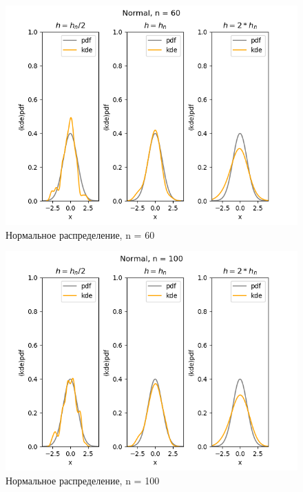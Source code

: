 \documentclass[../body.tex]{subfiles}
\begin{document}
\begin{figure}[H]
	\centering
	\includegraphics[width=\textwidth, height =0.4\textheight]{img/NormalKDE n = 60.png}
	\caption{Нормальное распределение, n = 60}
	\label{fig:normal_kde_60}
\end{figure}

\begin{figure}[H]
	\centering
	\includegraphics[width=\textwidth, height =0.4\textheight]{img/NormalKDE n = 100.png}
	\caption{Нормальное распределение, n = 100}
	\label{fig:normal_kde_100}
\end{figure}
\end{document}
